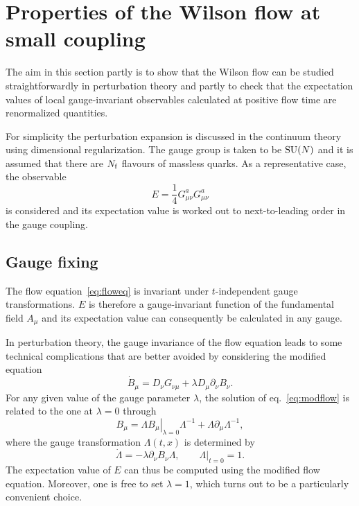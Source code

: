 \section{Properties of the Wilson flow at small coupling}

The aim in this section partly is to show that the
Wilson flow can be studied straightforwardly in perturbation
theory and partly to check that
the expectation values of local gauge-invariant
observables calculated at positive flow time
are renormalized quantities.

For simplicity the perturbation expansion
is discussed in the continuum theory using
dimensional regularization.
The gauge group is taken to be $\mathrm{SU}(N)$
and it is assumed that there are $N_{\mathrm{f}}$ flavours of
massless quarks. As a representative case,
the observable
\begin{equation}
   E=\frac{1}{4}G_{\mu\nu}^aG_{\mu\nu}^a
   \label{eq:Edens}
\end{equation}
is considered and its expectation value is worked out to
next-to-leading order in the gauge coupling.


\subsection{Gauge fixing}

The flow equation~\eqref{eq:floweq} is invariant
under $t$-independent gauge transformations.
$E$ is therefore a gauge-invariant function of the
fundamental field $A_{\mu}$ and its expectation value
can consequently be calculated in any gauge.

In perturbation theory, the gauge invariance of
the flow equation leads to some
technical complications that are better avoided by
considering the modified equation
\begin{equation}
  \dot{B}_{\mu}=D_{\nu}G_{\nu\mu}+\lambda D_{\mu}\partial_{\nu}B_{\nu}.
  \label{eq:modflow}
\end{equation}
For any given value of the gauge parameter $\lambda$,
the solution of eq.~\eqref{eq:modflow} is related to the one at
$\lambda=0$ through
\begin{equation}
  B_{\mu}=\Lambda\!\left.B_{\mu}\right|_{\lambda=0}\Lambda^{-1}
  +\Lambda\partial_{\mu}\Lambda^{-1},
  \label{eq:gaugetrafo}
\end{equation}
where the gauge transformation $\Lambda(t,x)$ is determined by
\begin{equation}
  \dot{\Lambda}=-\lambda \partial_{\nu}B_{\nu}\Lambda,
  \qquad\left.\Lambda\right|_{t=0}=1.
  \label{eq:Lambdatrafo}
\end{equation}
The expectation value of $E$
can thus be computed using the modified
flow equation. Moreover, one is free to set $\lambda=1$, which
turns out to be a particularly convenient choice.

